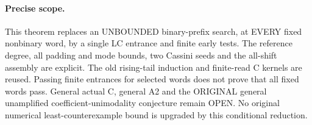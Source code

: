\paragraph{Precise scope.}
This theorem replaces an UNBOUNDED binary-prefix search, at EVERY
fixed nonbinary word, by a single LC entrance and finite early tests.
The reference degree, all padding and mode bounds, two Cassini seeds
and the all-shift assembly are explicit. The old rising-tail induction
and finite-read C kernels are reused. Passing finite entrances for
selected words does not prove that all fixed words pass.
General actual C, general A2 and the ORIGINAL general unamplified
coefficient-unimodality conjecture remain OPEN. No original numerical
least-counterexample bound is upgraded by this conditional reduction.
